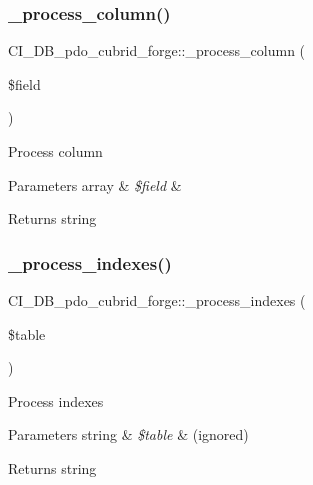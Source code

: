 \subsubsection{\texorpdfstring{\+\_\+process\+\_\+column()}{\_process\_column()}}
{\footnotesize\ttfamily C\+I\+\_\+\+D\+B\+\_\+pdo\+\_\+cubrid\+\_\+forge\+::\+\_\+process\+\_\+column (\begin{DoxyParamCaption}\item[{}]{\$field }\end{DoxyParamCaption})\hspace{0.3cm}{\ttfamily [protected]}}

Process column


\begin{DoxyParams}[1]{Parameters}
array & {\em \$field} & \\
\hline
\end{DoxyParams}
\begin{DoxyReturn}{Returns}
string 
\end{DoxyReturn}
\mbox{\label{class_c_i___d_b__pdo__cubrid__forge_a8289f3cda7509eff9e7d228ab57506d8}} 
\subsubsection{\texorpdfstring{\+\_\+process\+\_\+indexes()}{\_process\_indexes()}}
{\footnotesize\ttfamily C\+I\+\_\+\+D\+B\+\_\+pdo\+\_\+cubrid\+\_\+forge\+::\+\_\+process\+\_\+indexes (\begin{DoxyParamCaption}\item[{}]{\$table }\end{DoxyParamCaption})\hspace{0.3cm}{\ttfamily [protected]}}

Process indexes


\begin{DoxyParams}[1]{Parameters}
string & {\em \$table} & (ignored) \\
\hline
\end{DoxyParams}
\begin{DoxyReturn}{Returns}
string 
\end{DoxyReturn}


